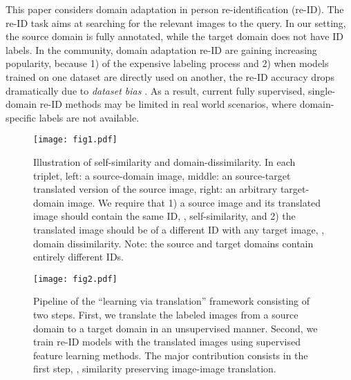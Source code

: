 \documentclass[10pt,twocolumn,letterpaper]{article}
\begin{document}
This paper considers domain adaptation in person re-identification (re-ID). The re-ID task aims at searching for the relevant images to the query. In our setting, the source domain is fully annotated, while the target domain does not have ID labels. In the community, domain adaptation re-ID are gaining increasing popularity, because 1) of the expensive labeling process and 2) 
when models trained on one dataset are directly used on another, the re-ID accuracy drops dramatically \cite{fan17unsupervised} due to \emph{dataset bias} \cite{DBLP:conf/cvpr/TorralbaE11}. As a result, current fully supervised, single-domain re-ID methods may be limited in real world scenarios, where domain-specific labels are not available. 

\begin{figure}[]
\setlength{\abovecaptionskip}{-0.1cm} 
\setlength{\belowcaptionskip}{-0.2cm}
\begin{center}
\texttt{[image: fig1.pdf]}
\end{center}
\caption{Illustration of self-similarity and domain-dissimilarity. In each triplet, left: a source-domain image, middle: an source-target translated version of the source image, right: an arbitrary target-domain image. We require that 1) a source image and its translated image should contain the same ID, \ie, self-similarity, and 2) the translated image should be of a different ID with any target image, \ie, domain dissimilarity. Note: the source and target domains contain entirely different IDs. }
\label{fig:carton}
\end{figure}

\begin{figure*}[t]
\setlength{\abovecaptionskip}{0cm}
\setlength{\belowcaptionskip}{-0.3cm}
\begin{center}
\texttt{[image: fig2.pdf]}
\end{center}
\caption{Pipeline of the ``learning via translation'' framework consisting of two steps. First, we translate the labeled images from a source domain to a target domain in an unsupervised manner. Second, we train re-ID models with the translated images using supervised feature learning methods. The major contribution consists in the first step, \ie,  similarity preserving image-image translation.}
\label{fig:framework}
\end{figure*}
\end{document}
